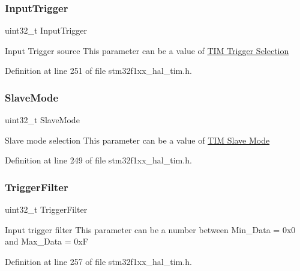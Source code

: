 \subsubsection{\texorpdfstring{Input\+Trigger}{InputTrigger}}
{\footnotesize\ttfamily uint32\+\_\+t Input\+Trigger}

Input Trigger source This parameter can be a value of \hyperlink{group___t_i_m___trigger___selection}{T\+IM Trigger Selection} 

Definition at line 251 of file stm32f1xx\+\_\+hal\+\_\+tim.\+h.

\mbox{\label{struct_t_i_m___slave_config_type_def_aa2b0001c7fceb00968ca503040874b4a}} 
\subsubsection{\texorpdfstring{Slave\+Mode}{SlaveMode}}
{\footnotesize\ttfamily uint32\+\_\+t Slave\+Mode}

Slave mode selection This parameter can be a value of \hyperlink{group___t_i_m___slave___mode}{T\+IM Slave Mode} 

Definition at line 249 of file stm32f1xx\+\_\+hal\+\_\+tim.\+h.

\mbox{\label{struct_t_i_m___slave_config_type_def_aef9e224ccafea4bfdd64193ea84feaf3}} 
\subsubsection{\texorpdfstring{Trigger\+Filter}{TriggerFilter}}
{\footnotesize\ttfamily uint32\+\_\+t Trigger\+Filter}

Input trigger filter This parameter can be a number between Min\+\_\+\+Data = 0x0 and Max\+\_\+\+Data = 0xF 

Definition at line 257 of file stm32f1xx\+\_\+hal\+\_\+tim.\+h.

\mbox{\label{struct_t_i_m___slave_config_type_def_afd12184c6e590581c775504a2e6c048c}} 
